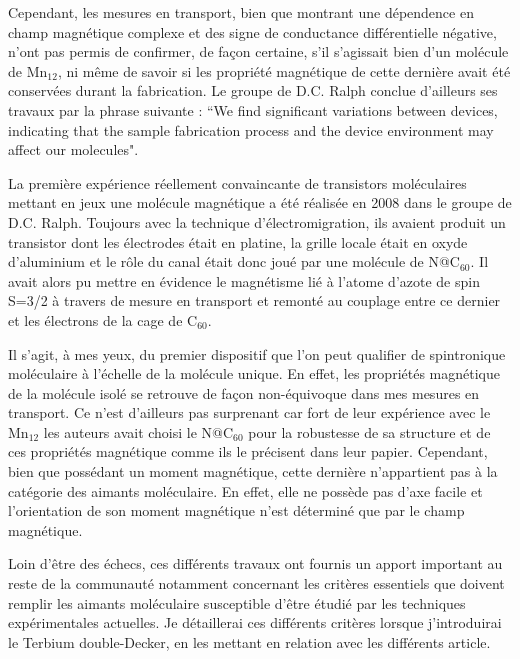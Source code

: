 Cependant, les mesures en transport, bien que montrant une dépendence en champ magnétique complexe et des signe de conductance différentielle négative, n'ont pas permis de confirmer, de façon certaine, s'il s'agissait bien d'un molécule de Mn$_{12}$, ni même de savoir si les propriété magnétique de cette dernière avait été conservées durant la fabrication. Le groupe de D.C. Ralph conclue d'ailleurs ses travaux par la phrase suivante : ``We find significant variations between devices, indicating that the sample fabrication process and the device environment may affect our molecules".

La première expérience réellement convaincante de transistors moléculaires mettant en jeux une molécule magnétique a été réalisée en 2008 dans le groupe de D.C. Ralph. Toujours avec la technique d'électromigration, ils avaient produit un transistor dont les électrodes était en platine, la grille locale était en oxyde d'aluminium et le rôle du canal était donc joué par une molécule de N@C$_{60}$. Il avait alors pu mettre en évidence le magnétisme lié à l'atome d'azote de spin S=3/2 à travers de mesure en transport et remonté au couplage entre ce dernier et les électrons de la cage de C$_{60}$. 

Il s'agit, à mes yeux, du premier dispositif que l'on peut qualifier de spintronique moléculaire à l'échelle de la molécule unique. En effet, les propriétés magnétique de la molécule isolé se retrouve de façon non-équivoque dans mes mesures en transport. Ce n'est d'ailleurs pas surprenant car fort de leur expérience avec le Mn$_{12}$ les auteurs avait choisi le N@C$_{60}$ pour la robustesse de sa structure et de ces propriétés magnétique comme ils le précisent dans leur papier. Cependant, bien que possédant un moment magnétique, cette dernière n'appartient pas à la catégorie des aimants moléculaire. En effet, elle ne possède pas d'axe facile et l'orientation de son moment magnétique n'est déterminé que par le champ magnétique.

Loin d'\^etre des échecs, ces différents travaux ont fournis un apport important au reste de la communauté notamment concernant les critères essentiels que doivent remplir les aimants moléculaire susceptible d'être étudié par les techniques expérimentales actuelles. Je détaillerai ces différents critères lorsque j'introduirai le Terbium double-Decker, en les mettant en relation avec les différents article.
 
